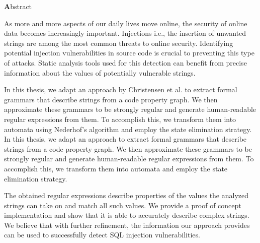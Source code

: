 \vspace*{2cm}

\begin{center}
{ \textbf Abstract}
\end{center}
\noindent

\def\true{1}

\def\false{0}


As more and more aspects of our daily lives move online, the security of online data becomes increasingly important. Injections \textendash{} i.e., the insertion of unwanted strings \textendash{} are among the most common threats to online security. Identifying potential injection vulnerabilities in source code is crucial to preventing this type of attacks. Static analysis tools used for this detection can benefit from precise information about the values of potentially vulnerable strings.

\if\true
In this thesis, we adapt an approach by Christensen et al. to extract formal grammars that describe strings from a code property graph. 
We then approximate these grammars to be strongly regular and generate human-readable regular expressions from them. To accomplish this, we transform them into automata using Nederhof's algorithm and employ the state elimination strategy.
\else
In this thesis, we adapt an approach to extract formal grammars that describe strings from a code property graph. 
We then approximate these grammars to be strongly regular and generate human-readable regular expressions from them. To accomplish this, we transform them into automata and employ the state elimination strategy.
\fi

The obtained regular expressions describe properties of the values the analyzed strings can take on and match all such values.
We provide a proof of concept implementation and show that it is able to accurately describe complex strings. We believe that with further refinement, the information our approach provides can be used to successfully detect SQL injection vulnerabilities.
